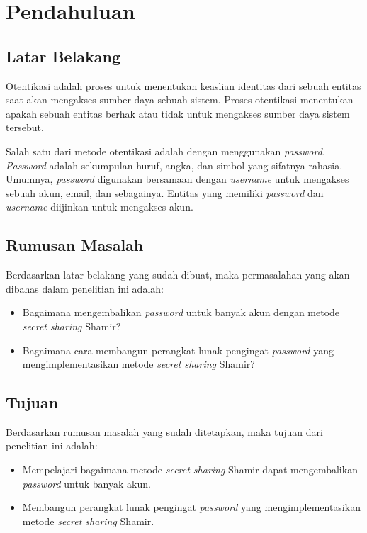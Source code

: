 \chapter{Pendahuluan}
\label{chap:Pendahuluan}

\section{\textbf{Latar Belakang}}
\label{sec:latar belakang}

Otentikasi adalah proses untuk menentukan keaslian identitas dari sebuah entitas saat akan mengakses sumber daya sebuah sistem. Proses otentikasi menentukan apakah sebuah entitas berhak atau tidak untuk mengakses sumber daya sistem tersebut.

Salah satu dari metode otentikasi adalah dengan menggunakan \textit{password}. \textit{Password} adalah sekumpulan huruf, angka, dan simbol yang sifatnya rahasia. Umumnya, \textit{password} digunakan bersamaan dengan \textit{username} untuk mengakses sebuah akun, email, dan sebagainya. Entitas yang memiliki \textit{password} dan \textit{username} diijinkan untuk mengakses akun.

\section{\textbf{Rumusan Masalah}}
\label{sec:rumusan masalah}

Berdasarkan latar belakang yang sudah dibuat, maka permasalahan yang akan dibahas dalam penelitian ini adalah:
\begin{itemize}
	\item Bagaimana mengembalikan \textit{password} untuk banyak akun dengan metode \textit{secret sharing} Shamir?
	\item Bagaimana cara membangun perangkat lunak pengingat \textit{password} yang mengimplementasikan metode \textit{secret sharing} Shamir?
\end{itemize}

\section{\textbf{Tujuan}}
\label{sec:tujuan}

Berdasarkan rumusan masalah yang sudah ditetapkan, maka tujuan dari penelitian ini adalah:
\begin{itemize}
	\item Mempelajari bagaimana metode \textit{secret sharing} Shamir dapat mengembalikan \textit{password} untuk banyak akun.
	\item Membangun perangkat lunak pengingat \textit{password} yang mengimplementasikan metode \textit{secret sharing} Shamir.
\end{itemize}

